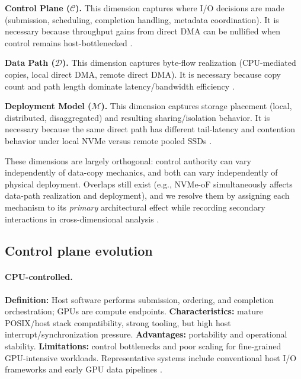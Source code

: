 \textbf{Control Plane ($\mathcal{C}$).} This dimension captures where I/O decisions are made (submission, scheduling, completion handling, metadata coordination). It is necessary because throughput gains from direct DMA can be nullified when control remains host-bottlenecked \cite{linux_io_uring,spdk_overview,qureshi2023bam}.

\textbf{Data Path ($\mathcal{D}$).} This dimension captures byte-flow realization (CPU-mediated copies, local direct DMA, remote direct DMA). It is necessary because copy count and path length dominate latency/bandwidth efficiency \cite{nvidia_gds_overview,nvidia_gdrdma,nvme_spec,infiniband_spec}.

\textbf{Deployment Model ($\mathcal{M}$).} This dimension captures storage placement (local, distributed, disaggregated) and resulting sharing/isolation behavior. It is necessary because the same direct path has different tail-latency and contention behavior under local NVMe versus remote pooled SSDs \cite{nvmeof_spec,liu2017rackscale,zhang2025hpcstoragesurvey}.

These dimensions are largely orthogonal: control authority can vary independently of data-copy mechanics, and both can vary independently of physical deployment. Overlaps still exist (e.g., NVMe-oF simultaneously affects data-path realization and deployment), and we resolve them by assigning each mechanism to its \emph{primary} architectural effect while recording secondary interactions in cross-dimensional analysis \cite{nvmeof_spec,nvidia_gdrdma}.

\subsection{Control plane evolution}

\paragraph{CPU-controlled.}
\textbf{Definition:} Host software performs submission, ordering, and completion orchestration; GPUs are compute endpoints. \textbf{Characteristics:} mature POSIX/host stack compatibility, strong tooling, but high host interrupt/synchronization pressure. \textbf{Advantages:} portability and operational stability. \textbf{Limitations:} control bottlenecks and poor scaling for fine-grained GPU-intensive workloads. Representative systems include conventional host I/O frameworks and early GPU data pipelines \cite{linux_io_uring,spdk_overview,murray2021tfdata}.

